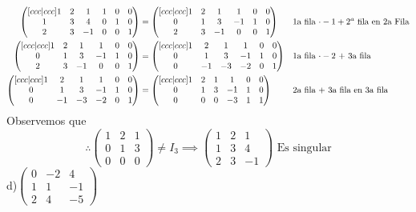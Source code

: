 \documentclass[letterpaper]{article}
\renewcommand{\*}{\cdot}
\theoremstyle{definition}
\begin{document}
	\begin{align*}
		\begin{pmatrix}[ccc|ccc]
		1 & 2 & 1 & 1 & 0 & 0\\
		1 & 3 & 4 & 0 & 1 & 0\\
		2 & 3 & -1 & 0 & 0 & 1
		\end{pmatrix} & = \begin{pmatrix}[ccc|ccc]
		1 & 2 & 1 & 1 & 0 & 0\\
		0 & 1 & 3 & -1 & 1 & 0\\
		2 & 3 & -1 & 0 & 0 & 1
		\end{pmatrix} && \text{1a fila $ \* -1  + 2^a$ fila en 2a Fila}\\
		\begin{pmatrix}[ccc|ccc]
		1 & 2 & 1 & 1 & 0 & 0\\
		0 & 1 & 3 & -1 & 1 & 0\\
		2 & 3 & -1 & 0 & 0 & 1
		\end{pmatrix} &= \begin{pmatrix}[ccc|ccc]
		1 & 2 & 1 & 1 & 0 & 0\\
		0 & 1 & 3 & -1 & 1 & 0\\
		0 & -1 & -3 & -2 & 0 & 1
		\end{pmatrix} && \text{1a fila $ \* -2 $ + 3a fila}\\
		\begin{pmatrix}[ccc|ccc]
		1 & 2 & 1 & 1 & 0 & 0\\
		0 & 1 & 3 & -1 & 1 & 0\\
		0 & -1 & -3 & -2 & 0 & 1
		\end{pmatrix} & = \begin{pmatrix}[ccc|ccc]
		1 & 2 & 1 & 1 & 0 & 0\\
		0 & 1 & 3 & -1 & 1 & 0\\
		0 & 0 & 0 & -3 & 1 & 1
		\end{pmatrix} && \text{2a fila + 3a fila en 3a fila}
	\end{align*}
	Observemos que 
	\[ \therefore \begin{pmatrix}
	1 & 2 & 1 \\
	0 & 1 & 3 \\
	0 & 0 & 0 
	\end{pmatrix} \neq I_3 \implies \begin{pmatrix} 1 & 2 & 1 \\ 1 & 3 & 4 \\ 2 & 3 & -1 \end{pmatrix} \text{ Es singular}  \]
	d)$\begin{pmatrix} 0 & -2 & 4 \\ 1 & 1 & -1 \\ 2 & 4 & -5 \end{pmatrix}$\\
\end{document}
